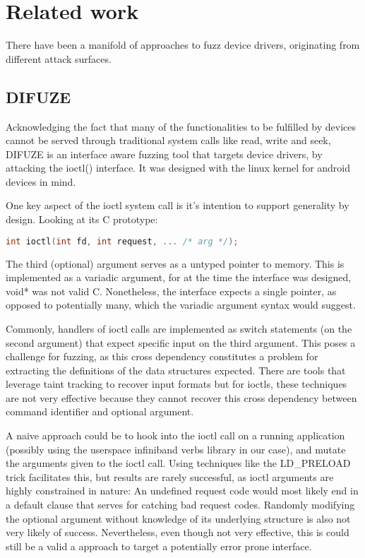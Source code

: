 \section{Related work}

There have been a manifold of approaches to fuzz device drivers, originating from different attack surfaces.

\subsection{DIFUZE}

Acknowledging the fact that many of the functionalities to be fulfilled by devices cannot be served through
traditional system calls like read, write and seek, DIFUZE is an interface aware fuzzing tool that targets
device drivers, by attacking the ioctl() interface\cite{difuze17}. It was designed with the linux kernel for
android devices in mind.

One key aspect of the ioctl system call is it's intention to support generality by design.
Looking at its C prototype:

\begin{lstlisting}[language=c]
  int ioctl(int fd, int request, ... /* arg */);
\end{lstlisting}

The third (optional) argument serves as a untyped pointer to memory. This is implemented as a variadic argument, for at the time
the interface was designed, void* was not valid C. Nonetheless, the interface expects a single pointer, as opposed to potentially
many, which the variadic argument syntax would suggest.

Commonly, handlers of ioctl calls are implemented as switch statements (on the second argument) that expect specific
input on the third argument. This poses a challenge for fuzzing, as this cross dependency constitutes a problem for extracting
the definitions of the data structures expected. There are tools that leverage taint tracking to recover input formats\cite{buzzfuzz}\cite{dowser}
but for ioctls, these techniques are not very effective\cite{difuze17} because they cannot recover this cross dependency between command identifier
and optional argument.

A naive approach could be to hook into the ioctl call on a running application (possibly using the userspace infiniband verbs library
in our case), and mutate the arguments given to the ioctl call. Using techniques like the LD\_PRELOAD trick facilitates this,
but results are rarely successful, as ioctl arguments are highly constrained in nature: An undefined request code
would most likely end in a default clause that serves for catching bad request codes. Randomly modifying the optional argument
without knowledge of its underlying structure is also not very likely of success.
Nevertheless, even though not very effective, this is could still be a valid a approach to target a potentially error prone interface.

